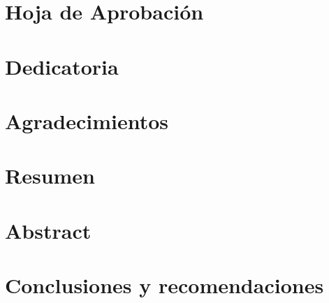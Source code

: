 \documentclass[11pt, sfdefaults=false, spanish]{scrreprt}
\begin{document}


\chapter*{Hoja de Aprobación}
\chapter*{Dedicatoria}
\chapter*{Agradecimientos}

\chapter*{Resumen}
\chapter*{Abstract}

\tableofcontents
\listoftables
\listoffigures











\chapter{Conclusiones y recomendaciones}

\printbibliography

\clearpage


\end{document}
